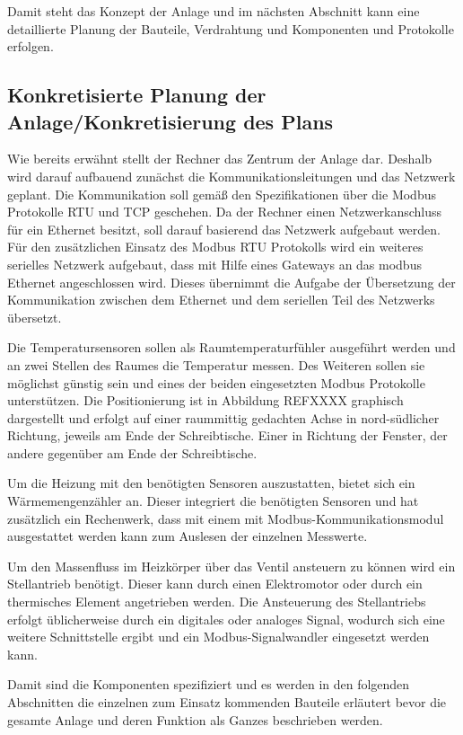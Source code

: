 Damit steht das Konzept der Anlage und im nächsten Abschnitt kann eine detaillierte Planung der Bauteile, Verdrahtung und Komponenten und Protokolle erfolgen.

\subsection{Konkretisierte Planung der Anlage/Konkretisierung des Plans}

Wie bereits erwähnt stellt der Rechner das Zentrum der Anlage dar. Deshalb wird darauf aufbauend zunächst die Kommunikationsleitungen und das Netzwerk geplant. Die Kommunikation soll gemäß den Spezifikationen über die Modbus Protokolle RTU und TCP geschehen. Da der Rechner einen Netzwerkanschluss für ein Ethernet besitzt, soll darauf basierend das Netzwerk aufgebaut werden. Für den zusätzlichen Einsatz des Modbus RTU Protokolls wird ein weiteres serielles Netzwerk aufgebaut, dass mit Hilfe eines Gateways an das modbus Ethernet angeschlossen wird. Dieses übernimmt die Aufgabe der Übersetzung der Kommunikation zwischen dem Ethernet und dem seriellen Teil des Netzwerks übersetzt.

Die Temperatursensoren sollen als Raumtemperaturfühler ausgeführt werden und an zwei Stellen des Raumes die Temperatur messen. Des Weiteren sollen sie möglichst günstig sein und eines der beiden eingesetzten Modbus Protokolle unterstützen. Die Positionierung ist in Abbildung REFXXXX graphisch dargestellt und erfolgt auf einer raummittig gedachten Achse in nord-südlicher Richtung, jeweils am Ende der Schreibtische. Einer in Richtung der Fenster, der andere gegenüber am Ende der Schreibtische.

Um die Heizung mit den benötigten Sensoren auszustatten, bietet sich ein Wärmemengenzähler an. Dieser integriert die benötigten Sensoren und hat zusätzlich ein Rechenwerk, dass mit einem mit Modbus-Kommunikationsmodul ausgestattet werden kann zum Auslesen der einzelnen Messwerte.

Um den Massenfluss im Heizkörper über das Ventil ansteuern zu können wird ein Stellantrieb benötigt. Dieser kann durch einen Elektromotor oder durch ein thermisches Element angetrieben werden. Die Ansteuerung des Stellantriebs erfolgt üblicherweise durch ein digitales oder analoges Signal, wodurch sich eine weitere Schnittstelle ergibt und ein Modbus-Signalwandler eingesetzt werden kann.

Damit sind die Komponenten spezifiziert und es werden in den folgenden Abschnitten die einzelnen zum Einsatz kommenden Bauteile erläutert bevor die gesamte Anlage und deren Funktion als Ganzes beschrieben werden.

